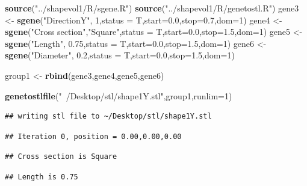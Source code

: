 \documentclass[]{article}
\newenvironment{Shaded}{\begin{snugshade}}{\end{snugshade}}
\newcommand{\DataTypeTok}[1]{\textcolor[rgb]{0.13,0.29,0.53}{#1}}
\newcommand{\DecValTok}[1]{\textcolor[rgb]{0.00,0.00,0.81}{#1}}
\newcommand{\FloatTok}[1]{\textcolor[rgb]{0.00,0.00,0.81}{#1}}
\newcommand{\KeywordTok}[1]{\textcolor[rgb]{0.13,0.29,0.53}{\textbf{#1}}}
\newcommand{\NormalTok}[1]{#1}
\newcommand{\StringTok}[1]{\textcolor[rgb]{0.31,0.60,0.02}{#1}}
\begin{document}
\begin{Shaded}
\begin{Highlighting}[]
\KeywordTok{source}\NormalTok{(}\StringTok{"../shapevol1/R/sgene.R"}\NormalTok{)}
\KeywordTok{source}\NormalTok{(}\StringTok{"../shapevol1/R/genetostl.R"}\NormalTok{)}
\NormalTok{gene3 <-}\StringTok{ }\KeywordTok{sgene}\NormalTok{(}\StringTok{"DirectionY"}\NormalTok{,          }\DecValTok{1}\NormalTok{,}\DataTypeTok{status =}\NormalTok{ T,}\DataTypeTok{start=}\FloatTok{0.0}\NormalTok{,}\DataTypeTok{stop=}\FloatTok{0.7}\NormalTok{,}\DataTypeTok{dom=}\DecValTok{1}\NormalTok{)}
\NormalTok{gene4 <-}\StringTok{ }\KeywordTok{sgene}\NormalTok{(}\StringTok{"Cross section"}\NormalTok{,}\StringTok{"Square"}\NormalTok{,}\DataTypeTok{status =}\NormalTok{ T,}\DataTypeTok{start=}\FloatTok{0.0}\NormalTok{,}\DataTypeTok{stop=}\FloatTok{1.5}\NormalTok{,}\DataTypeTok{dom=}\DecValTok{1}\NormalTok{)}
\NormalTok{gene5 <-}\StringTok{ }\KeywordTok{sgene}\NormalTok{(}\StringTok{"Length"}\NormalTok{,            }\FloatTok{0.75}\NormalTok{,}\DataTypeTok{status =}\NormalTok{ T,}\DataTypeTok{start=}\FloatTok{0.0}\NormalTok{,}\DataTypeTok{stop=}\FloatTok{1.5}\NormalTok{,}\DataTypeTok{dom=}\DecValTok{1}\NormalTok{)}
\NormalTok{gene6 <-}\StringTok{ }\KeywordTok{sgene}\NormalTok{(}\StringTok{"Diameter"}\NormalTok{,          }\FloatTok{0.2}\NormalTok{,}\DataTypeTok{status =}\NormalTok{ T,}\DataTypeTok{start=}\FloatTok{0.0}\NormalTok{,}\DataTypeTok{stop=}\FloatTok{1.5}\NormalTok{,}\DataTypeTok{dom=}\DecValTok{1}\NormalTok{)}

\NormalTok{group1 <-}\StringTok{ }\KeywordTok{rbind}\NormalTok{(gene3,gene4,gene5,gene6)}

\KeywordTok{genetostlfile}\NormalTok{(}\StringTok{"~/Desktop/stl/shape1Y.stl"}\NormalTok{,group1,}\DataTypeTok{runlim=}\DecValTok{1}\NormalTok{)}
\end{Highlighting}
\end{Shaded}

\begin{verbatim}
## writing stl file to ~/Desktop/stl/shape1Y.stl
\end{verbatim}

\begin{verbatim}
## Iteration 0, position = 0.00,0.00,0.00
\end{verbatim}

\begin{verbatim}
## Cross section is Square
\end{verbatim}

\begin{verbatim}
## Length is 0.75
\end{verbatim}
\end{document}
